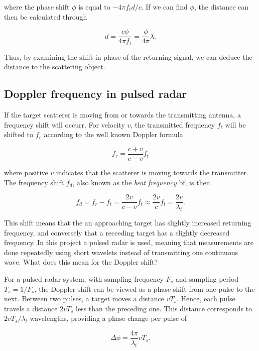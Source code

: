 where the phase shift $\phi$ is equal to $-4\pi f_t d/c$. If we can find $\phi$, the distance can then be calculated through

\begin{equation}
	d
	= \frac{c \phi}{4\pi f_t}
	= \frac{\phi}{4\pi}\lambda.
\end{equation}

Thus, by examining the shift in phase of the returning signal, we can deduce the distance to the scattering object. 

\subsection{Doppler frequency in pulsed radar}

If the target scatterer is moving from or towards the transmitting antenna, a frequency shift will occurr. For velocity $v$, the transmitted frequency $f_t$ will be shifted to $f_r$ according to the well known Doppler formula \citep{ridenour_1947}

\begin{equation}
	f_r = \frac{c + v}{c - v}f_t
\end{equation}

where positive $v$ indicates that the scatterer is moving towards the transmitter. The frequency shift $f_d$, also known as the \emph{beat frequency} \gls{bf}, is then

\begin{equation}\label{eq:dshift}
	f_d 
	= f_r - f_t 
	= \frac{2v}{c-v}f_t \approx \frac{2v}{c}f_t 
	= \frac{2v}{\lambda_t}.
\end{equation}

This shift means that the an approaching target has slightly increased returning frequency, and conversely that a receeding target has a slightly decreased frequency. In this project a pulsed radar is used, meaning that measurements are done repeatedly using short wavelets instead of transmitting one continuous wave. What does this mean for the Doppler shift?

For a pulsed radar system, with sampling frequency $F_s$ and sampling period $T_s = 1/F_s$, the Doppler shift can be viewed as a phase shift from one pulse to the next. Between two pulses, a target moves a distance $vT_s$. Hence, each pulse travels a distance $2vT_s$ less than the preceding one. This distance corresponds to $2vT_s/\lambda_t$ wavelengths, providing a phase change per pulse of

\begin{equation}
	\Delta \phi = \frac{4\pi}{\lambda_t}vT_s.
\end{equation}

